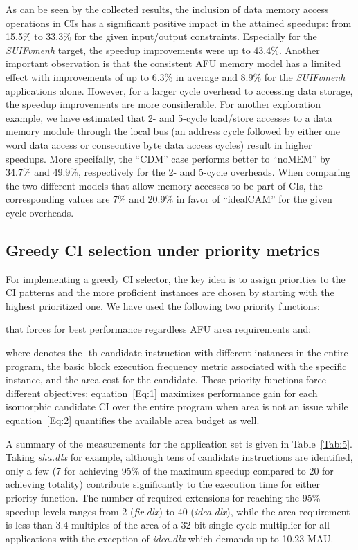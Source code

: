 \documentclass{comjnl}
\begin{document}
As can be seen by the collected results, the inclusion of data memory access operations in CIs has a significant positive impact in the attained speedups: from 15.5\% to 33.3\% for the given input/output constraints. Especially for the {\it SUIFvmenh} target, the speedup improvements were up to 43.4\%. Another important observation is that the consistent AFU memory model has a limited effect with improvements of up to 6.3\% in average and 8.9\% for the {\it SUIFvmenh} applications alone. However, for a larger cycle overhead to accessing data storage, the speedup improvements are more considerable. For another exploration example, we have estimated that 2- and 5-cycle load/store accesses to a data memory module through the local bus (an address cycle followed by either one word data access or consecutive byte data access cycles) result in higher speedups. More specifally, the ``CDM'' case performs better to ``noMEM'' by 34.7\% and 49.9\%, respectively for the 2- and 5-cycle overheads. When comparing the two different models that allow memory accesses to be part of CIs, the corresponding values are 7\% and 20.9\% in favor of ``idealCAM'' for the given cycle overheads. 

\subsection{Greedy CI selection under priority metrics}
\label{Sec:GreedySelection}
For implementing a greedy CI selector, the key idea is to assign priorities to the CI patterns and the more proficient instances are chosen by starting with the highest prioritized one. We have used the following two priority functions: 



that forces for best performance regardless AFU area requirements and: 



where  denotes the -th candidate instruction with  different instances in the entire program,  the basic block execution frequency metric associated with the specific instance, and  the area cost for the candidate. These priority functions force different objectives: equation~\ref{Eq:1} maximizes performance gain for each isomorphic candidate CI over the entire program when area is not an issue while equation~\ref{Eq:2} quantifies the available area budget as well.

A summary of the measurements for the application set is given in Table~\ref{Tab:5}. 
Taking {\it sha.dlx} for example, although tens of candidate instructions are identified, 
only a few (7 for achieving 95\% of the maximum speedup compared to 20 for achieving totality) contribute significantly to the execution time for either priority function. The 
number of required extensions for reaching the 95\% speedup levels ranges from 2 ({\it fir.dlx}) to 40 ({\it idea.dlx}), while the area requirement is less than 3.4 multiples of the area of a 32-bit single-cycle multiplier for all applications with the exception of {\it idea.dlx} which demands up to 10.23 MAU. 
\end{document}
